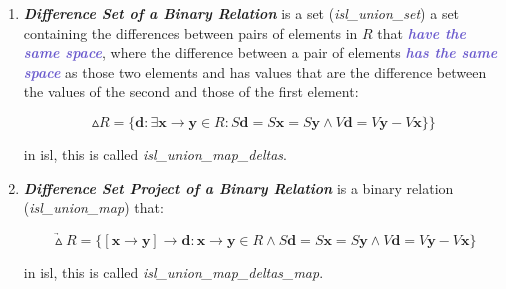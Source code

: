 \begin{enumerate}
  \item \textcolor{vr}{\textbf{\emph{Difference Set of a Binary Relation}}} is a set (\textcolor{pg}{\emph{isl\_union\_set}}) a set containing the differences between pairs of elements in $R$ that \textcolor{slateblue}{\textbf{\textit{have the same space}}}, where the difference between a pair of elements \textcolor{slateblue}{\textbf{\textit{has the same space}}} as those two elements and has values that are the difference between the values of the second and those of the first element:

  $$\vartriangle R = \{\mathbf{d}: \exists \mathbf{x} \rightarrow \mathbf{y} \in R:
  \mathit{S}\mathbf{d} = \mathit{S}\mathbf{x} =\mathit{S}\mathbf{y} \wedge
  \mathit{V}\mathbf{d} = \mathit{V}\mathbf{y} - \mathit{V}\mathbf{x}\}\}$$

  in isl, this is called \textcolor{pg}{\emph{isl\_union\_map\_deltas}}.

  \item \textcolor{vr}{\textbf{\emph{Difference Set Project of a Binary Relation}}} is a binary relation (\textcolor{pg}{\emph{isl\_union\_map}}) that:

  $$\underrightarrow{\vartriangle} R = \{[\mathbf{x} \rightarrow \mathbf{y}] \rightarrow \mathbf{d}:
  \mathbf{x} \rightarrow \mathbf{y} \in R \wedge \mathit{S}\mathbf{d} = \mathit{S}\mathbf{x} = \mathit{S}\mathbf{y}
  \wedge \mathit{V}\mathbf{d} = \mathit{V}\mathbf{y} - \mathit{V}\mathbf{x}\}$$

  in isl, this is called \textcolor{pg}{\emph{isl\_union\_map\_deltas\_map}}.
\end{enumerate}
